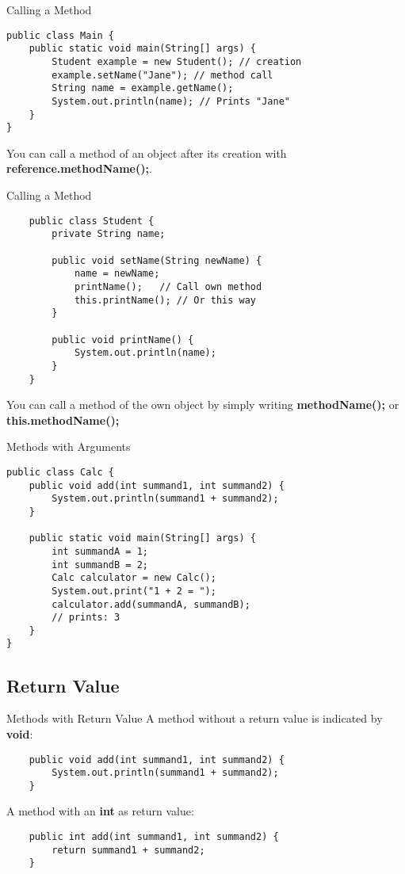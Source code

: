 \begin{frame}[fragile]{Calling a Method}
\begin{lstlisting}
public class Main {
    public static void main(String[] args) {
        Student example = new Student(); // creation
        example.setName("Jane"); // method call
        String name = example.getName(); 
		System.out.println(name); // Prints "Jane"
    }
}
	\end{lstlisting}
	You can call a method of an object after its creation with \textbf{reference.methodName();}.
\end{frame}

\begin{frame}[fragile]{Calling a Method}
\begin{lstlisting}
	public class Student {
		private String name;
	
	    public void setName(String newName) {
			name = newName;
			printName();   // Call own method
			this.printName(); // Or this way
	    }
	    
	    public void printName() {
	        System.out.println(name);
	    }
	}
	\end{lstlisting}
	You can call a method of the own object by simply writing \textbf{methodName();} or \textbf{this.methodName();}
\end{frame}

\begin{frame}[fragile]{Methods with Arguments}

\begin{lstlisting}
public class Calc {
    public void add(int summand1, int summand2) {
        System.out.println(summand1 + summand2);
    }
	    
    public static void main(String[] args) {
        int summandA = 1;
        int summandB = 2;
        Calc calculator = new Calc();
        System.out.print("1 + 2 = ");
        calculator.add(summandA, summandB); 
		// prints: 3
    }
}
	\end{lstlisting}
\end{frame}

\subsection{Return Value}
\begin{frame}[fragile]{Methods with Return Value}
	A method without a return value is indicated by \textbf{void}:
	\begin{lstlisting}
	public void add(int summand1, int summand2) {
	    System.out.println(summand1 + summand2);
	}
	\end{lstlisting}
	A method with an \textbf{int} as return value:
	\begin{lstlisting}
	public int add(int summand1, int summand2) {
	    return summand1 + summand2;
	}
	\end{lstlisting}
\end{frame}

